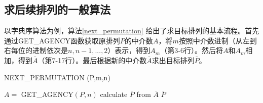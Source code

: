 \documentclass[6pt, twocolumn]{ctexart}
\begin{document}
\subsection{求后续排列的一般算法}
以字典序算法为例，算法\ref{next_permutation} 给出了求目标排列的基本流程。首先通过GET\_AGENCY函数获取原排列$P$的中介数$A$，将$m$按照中介数进制（从左到右每位的进制依次是$n,n-1,...,2$）表示，得到$A_m$（第3-6行）。然后将$A$和$A_m$相加，得到$\bar{A}$（第7-17行）。最后根据新的中介数$\bar{A}$求出目标排列$\bar{P}$。
\begin{algorithm}
\caption{NEXT\_PERMUTATION (P,m,n)}
\label{next_permutation}
\begin{algorithmic}[1]
\STATE $A=$ GET\_AGENCY$(P,n)$
\ENDFOR
{}
\ELSE
{}
\ENDIF
\ENDFOR
\STATE calculate $\bar{P}$ from $\bar{A}$
\RETURN $\bar{P}$
\end{algorithmic}
\end{algorithm}

\end{document}
